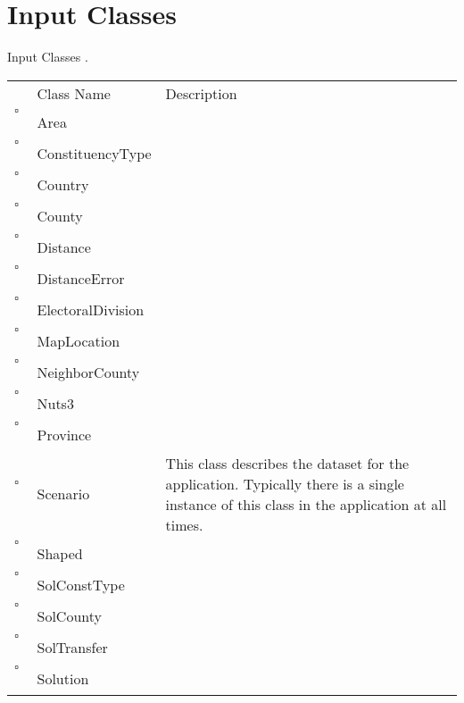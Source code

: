 \chapter{Input Classes}
Input Classes     .
\begin{longtable}{llp{8cm}}
& Class Name & Description \\
$\square$\ & Area &  \\
$\square$\ & ConstituencyType &  \\
$\square$\ & Country &  \\
$\square$\ & County &  \\
$\square$\ & Distance &  \\
$\square$\ & DistanceError &  \\
$\square$\ & ElectoralDivision &  \\
$\square$\ & MapLocation &  \\
$\square$\ & NeighborCounty &  \\
$\square$\ & Nuts3 &  \\
$\square$\ & Province &  \\
$\square$\ & Scenario & This class describes the dataset for the application. Typically there is a single instance of this class in the application at all times. \\
$\square$\ & Shaped &  \\
$\square$\ & SolConstType &  \\
$\square$\ & SolCounty &  \\
$\square$\ & SolTransfer &  \\
$\square$\ & Solution &  \\
\end{longtable}

